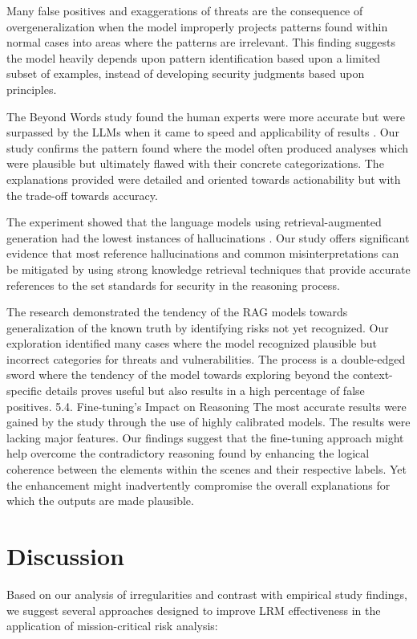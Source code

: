 \documentclass[sigconf]{acmart}
\begin{document}
Many false positives and exaggerations of threats are the consequence of overgeneralization when the model improperly projects patterns found within normal cases into areas where the patterns are irrelevant. This finding suggests the model heavily depends upon pattern identification based upon a limited subset of examples, instead of developing security judgments based upon principles.

The Beyond Words study found the human experts were more accurate but were surpassed by the LLMs when it came to speed and applicability of results \citep{esposito2024beyond}. Our study confirms the pattern found where the model often produced analyses which were plausible but ultimately flawed with their concrete categorizations. The explanations provided were detailed and oriented towards actionability but with the trade-off towards accuracy.

The experiment showed that the language models using retrieval-augmented generation had the lowest instances of hallucinations \citep{esposito2024beyond}. Our study offers significant evidence that most reference hallucinations and common misinterpretations can be mitigated by using strong knowledge retrieval techniques that provide accurate references to the set standards for security in the reasoning process.

The research demonstrated the tendency of the RAG models towards generalization of the known truth by identifying risks not yet recognized. Our exploration identified many cases where the model recognized plausible but incorrect categories for threats and vulnerabilities. The process is a double-edged sword where the tendency of the model towards exploring beyond the context-specific details proves useful but also results in a high percentage of false positives. 5.4. Fine-tuning's Impact on Reasoning The most accurate results were gained by the study through the use of highly calibrated models. The results were lacking major features. Our findings suggest that the fine-tuning approach might help overcome the contradictory reasoning found by enhancing the logical coherence between the elements within the scenes and their respective labels. Yet the enhancement might inadvertently compromise the overall explanations for which the outputs are made plausible.


\section{Discussion}
Based on our analysis of irregularities and contrast with empirical study findings, we suggest several approaches designed to improve LRM effectiveness in the application of mission-critical risk analysis:
\end{document}
